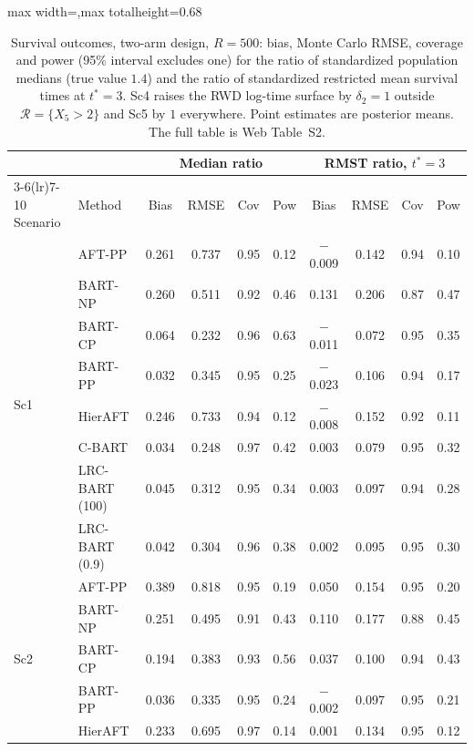 \documentclass[11pt]{article}
\theoremstyle{definition}
\theoremstyle{plain}
\begin{document}
\begin{table}[htbp]
\centering
\singlespacing
\caption{Survival outcomes, two-arm design, $R=500$: bias, Monte Carlo RMSE, coverage and power (95\% interval excludes one) for the ratio of standardized population medians (true value $1.4$) and the ratio of standardized restricted mean survival times at $t^\ast=3$. Sc4 raises the RWD log-time surface by $\delta_2=1$ outside $\mathcal R=\{X_5>2\}$ and Sc5 by $1$ everywhere. Point estimates are posterior means. The full table is Web Table~S2.}
\label{tab:surv}
\scriptsize
\setlength{\tabcolsep}{4pt}
\renewcommand{\arraystretch}{0.8}
\begin{adjustbox}{max width=\textwidth,max totalheight=0.68\textheight}
\begin{tabular}{llcccccccc}
\toprule
& & \multicolumn{4}{c}{Median ratio} & \multicolumn{4}{c}{RMST ratio, $t^\ast=3$} \\
\cmidrule(lr){3-6}\cmidrule(lr){7-10}
Scenario & Method & Bias & RMSE & Cov & Pow & Bias & RMSE & Cov & Pow \\
\midrule
\multirow{8}{*}{Sc1} & AFT-PP & 0.261 & 0.737 & 0.95 & 0.12 & $-$0.009 & 0.142 & 0.94 & 0.10 \\
& BART-NP & 0.260 & 0.511 & 0.92 & 0.46 & 0.131 & 0.206 & 0.87 & 0.47 \\
& BART-CP & 0.064 & 0.232 & 0.96 & 0.63 & $-$0.011 & 0.072 & 0.95 & 0.35 \\
& BART-PP & 0.032 & 0.345 & 0.95 & 0.25 & $-$0.023 & 0.106 & 0.94 & 0.17 \\
& HierAFT & 0.246 & 0.733 & 0.94 & 0.12 & $-$0.008 & 0.152 & 0.92 & 0.11 \\
& C-BART & 0.034 & 0.248 & 0.97 & 0.42 & 0.003 & 0.079 & 0.95 & 0.32 \\
& LRC-BART (100) & 0.045 & 0.312 & 0.95 & 0.34 & 0.003 & 0.097 & 0.94 & 0.28 \\
& LRC-BART (0.9) & 0.042 & 0.304 & 0.96 & 0.38 & 0.002 & 0.095 & 0.95 & 0.30 \\
\midrule
\multirow{8}{*}{Sc2} & AFT-PP & 0.389 & 0.818 & 0.95 & 0.19 & 0.050 & 0.154 & 0.95 & 0.20 \\
& BART-NP & 0.251 & 0.495 & 0.91 & 0.43 & 0.110 & 0.177 & 0.88 & 0.45 \\
& BART-CP & 0.194 & 0.383 & 0.93 & 0.56 & 0.037 & 0.100 & 0.94 & 0.43 \\
& BART-PP & 0.036 & 0.335 & 0.95 & 0.24 & $-$0.002 & 0.097 & 0.95 & 0.21 \\
& HierAFT & 0.233 & 0.695 & 0.97 & 0.14 & 0.001 & 0.134 & 0.95 & 0.12 \\

\end{tabular}
\end{adjustbox}
\end{table}
\end{document}
